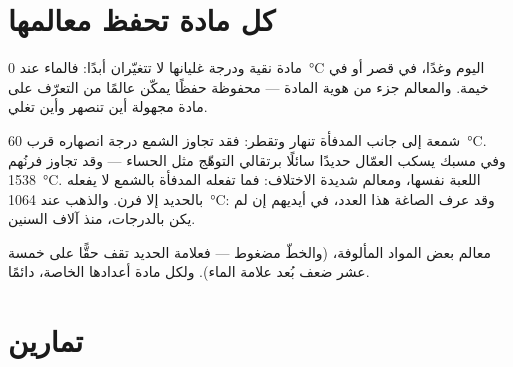 \section{كل مادة تحفظ معالمها}

\begin{proposition}\label{prop:g4:changes-of-state:identity}
 مادة نقية ودرجة غليانها لا تتغيّران أبدًا: فالماء
 عند \qty{0}{\celsius} اليوم وغدًا، في قصر أو في خيمة.
والمعالم جزء من هوية المادة --- محفوظة حفظًا يمكّن عالمًا من
التعرّف على مادة مجهولة  أين تنصهر وأين تغلي.
\end{proposition}

\begin{example}\label{ex:g4:changes-of-state:foundry}
شمعة إلى جانب المدفأة تنهار وتقطر: فقد تجاوز الشمع درجة انصهاره
قرب \qty{60}{\celsius}. وفي مسبك يسكب العمّال حديدًا سائلًا برتقالي
التوهّج مثل الحساء --- وقد تجاوز فرنُهم \qty{1538}{\celsius}.
اللعبة نفسها، ومعالم شديدة الاختلاف: فما تفعله المدفأة بالشمع لا
يفعله بالحديد إلا فرن. والذهب  عند \qty{1064}{\celsius}:
وقد عرف الصاغة هذا العدد، في أيديهم إن لم يكن بالدرجات، منذ
آلاف السنين.
\end{example}

\begin{omfigure}

{\small معالم بعض المواد المألوفة،  (والخطّ
مضغوط --- فعلامة الحديد تقف حقًّا على خمسة عشر ضعف بُعد علامة
الماء). ولكل مادة أعدادها الخاصة، دائمًا.}
\end{omfigure}

\section{تمارين}

